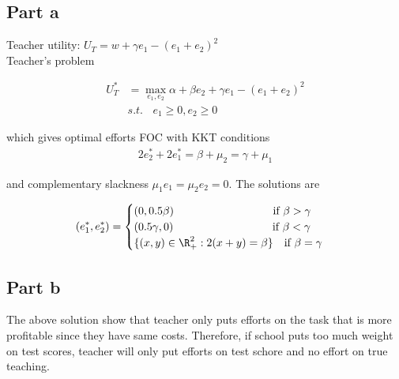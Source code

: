 \subsection*{Part a}

Teacher utility: $U_T = w + \gamma e_1 - (e_1 + e_2)^2$\\

Teacher's problem

\begin{align*}
    U_T^* &= \max_{e_1, e_2} \alpha + \beta e_2  + \gamma e_1 - (e_1 + e_2)^2\\
    &s.t.~~~~ e_1\ge 0, e_2 \ge 0
\end{align*}

which gives optimal efforts FOC with KKT conditions 
\begin{align*}
    2e^*_2 + 2e^*_1 = \beta + \mu_2= \gamma  + \mu_1 
\end{align*}

and complementary slackness $\mu_1 e_1 = \mu_2 e_2 = 0$. The solutions are 

\begin{align*}
    (e^*_1, e^*_2) = \begin{cases}
        (0, 0.5\beta)~~~~~~~~~~~~~~~~~~~~~~~~~~~\text{if}~ \beta > \gamma\\
        (0.5\gamma, 0)~~~~~~~~~~~~~~~~~~~~~~~~~~~\text{if}~ \beta < \gamma\\
        \{(x, y)\in \R_{+}^2: 2(x+y) = \beta\}~~~\text{if}~ \beta = \gamma\\
    \end{cases}
\end{align*}

\subsection*{Part b}

The above solution show that teacher only puts efforts on the task that is more profitable since they have same costs. Therefore, if school puts too much weight on test scores, teacher will only put efforts on test schore and no effort on true teaching.